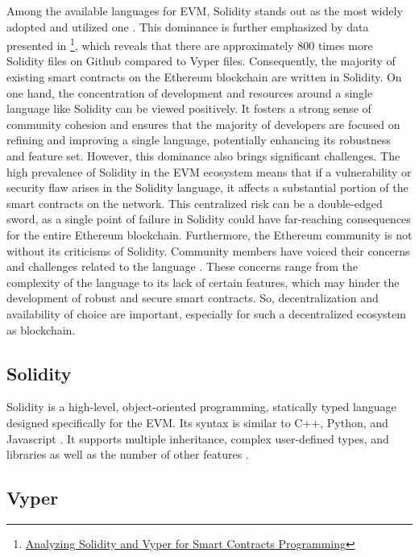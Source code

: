Among the available languages for EVM, Solidity stands out as the most widely adopted and utilized one \cite{SolidityWidelyUsed, SolidityDevsChallenges}. This dominance is further emphasized by data presented in \footnote{\href{https://blockchain.oodles.io/blog/solidity-vyper-smart-contracts-programming/}{Analyzing Solidity and Vyper for Smart Contracts Programming}}, which reveals that there are approximately 800 times more Solidity files on Github compared to Vyper files. Consequently, the majority of existing smart contracts on the Ethereum blockchain are written in Solidity. On one hand, the concentration of development and resources around a single language like Solidity can be viewed positively. It fosters a strong sense of community cohesion and ensures that the majority of developers are focused on refining and improving a single language, potentially enhancing its robustness and feature set. However, this dominance also brings significant challenges. The high prevalence of Solidity in the EVM ecosystem means that if a vulnerability or security flaw arises in the Solidity language, it affects a substantial portion of the smart contracts on the network. This centralized risk can be a double-edged sword, as a single point of failure in Solidity could have far-reaching consequences for the entire Ethereum blockchain. Furthermore, the Ethereum community is not without its criticisms of Solidity. Community members have voiced their concerns and challenges related to the language \cite{SolidityDevsChallenges}. These concerns range from the complexity of the language to its lack of certain features, which may hinder the development of robust and secure smart contracts. So, decentralization and availability of choice are important, especially for such a decentralized ecosystem as blockchain.

\subsection{Solidity}

Solidity is a high-level, object-oriented programming, statically typed language designed specifically for the EVM. Its syntax is similar to C++, Python, and Javascript \cite{SolidityInspirasion}. It supports multiple inheritance, complex user-defined types, and libraries as well as the number of other features \cite{SolidityFeatures}.

\subsection{Vyper}

